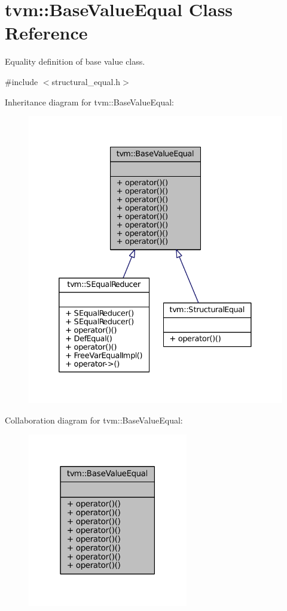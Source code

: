 \hypertarget{classtvm_1_1BaseValueEqual}{}\section{tvm\+:\+:Base\+Value\+Equal Class Reference}
\label{classtvm_1_1BaseValueEqual}


Equality definition of base value class.  




{\ttfamily \#include $<$structural\+\_\+equal.\+h$>$}



Inheritance diagram for tvm\+:\+:Base\+Value\+Equal\+:
\nopagebreak
\begin{figure}[H]
\begin{center}
\leavevmode
\includegraphics[width=332pt]{classtvm_1_1BaseValueEqual__inherit__graph}
\end{center}
\end{figure}


Collaboration diagram for tvm\+:\+:Base\+Value\+Equal\+:
\nopagebreak
\begin{figure}[H]
\begin{center}
\leavevmode
\includegraphics[width=198pt]{classtvm_1_1BaseValueEqual__coll__graph}
\end{center}
\end{figure}
